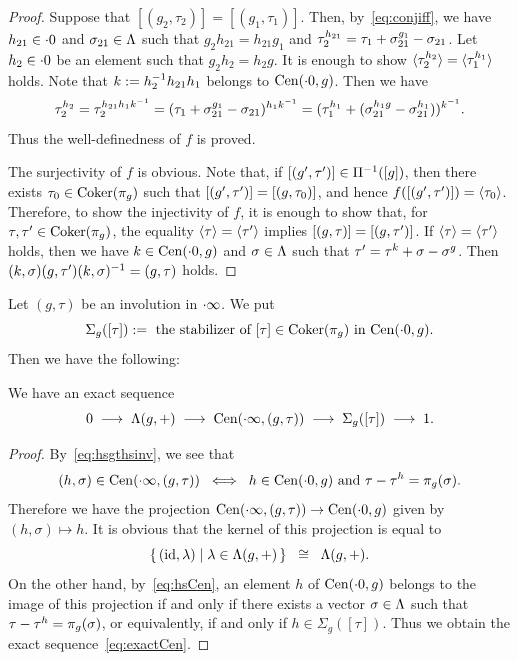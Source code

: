 \documentclass{amsart} %
\begin{document}
%
\begin{proof}
Suppose that $[(g_2, \tau_2)]=[(g_1, \tau_1)] $.
Then, by~\eqref{eq:conjiff}, we have $h_{21}\in \cdot 0$ and $\sigma_{21}\in \Lambda$ 
such that $g_2 h_{21}=h_{21} g_1$
and $\tau_2\sp{h_{21}}=\tau_1 +\sigma_{21}\sp{g_1}-\sigma_{21}$.
Let $h_2\in \cdot 0 $ be an element 
such that $g_2 h_2=h_2 g $.
It is enough to show 
$\langle {\tau_2^{ h_2}} \rangle=\langle {\tau_1^{h_1}} \rangle$ holds.
Note that $k:=h_2^{-1} h_{21} h_1$ belongs to $\mathrm{Cen}(\cdot 0, g)$.
Then we have 
\[
\tau_2^{ h_2}=\tau_2^{ h_{21} h_1 k^{-1}}
=(\tau_1 +\sigma_{21}\sp{g_1}-\sigma_{21})^{ h_1 k^{-1}}
=(\tau_1\sp{ h_1}+(\sigma_{21}\sp{h_1 g}-\sigma_{21}\sp{h_1}))^{k^{-1}}.
\]
Thus the well-definedness of $f$ is proved.
\par
The surjectivity of $f$ is obvious.
Note that, if $[(g^{\prime}, \tau^{\prime})]\in \Pi^{-1}([g])$,
then there exists $\tau_0\in \operatorname{Coker}(\pi_{g})$ such that 
$[(g^{\prime}, \tau^{\prime})]=[(g, \tau_0)]$, 
and hence
$f([(g^{\prime}, \tau^{\prime})])=\langle {\tau_0} \rangle$.
Therefore, to show the injectivity of $f$,
it is enough to show that, 
for $\tau, \tau^{\prime}\in \operatorname{Coker}(\pi_{g})$,
the equality $\langle {\tau} \rangle=\langle {\tau^{\prime}} \rangle$ implies 
$[(g, \tau)]=[(g, \tau^{\prime})]$.
If $\langle {\tau} \rangle=\langle {\tau^{\prime}} \rangle$ holds,
then we have $k\in \mathrm{Cen}(\cdot 0, g)$ and $\sigma\in \Lambda$
such that $\tau^{\prime}=\tau^k+\sigma-\sigma^g$.
Then $(k, \sigma)(g, \tau^{\prime})(k, \sigma)^{-1}=(g, \tau)$ holds.
%
\end{proof}
%
%
%
Let $(g, \tau)$ be an involution in $\cdot \infty$.
We put
\[
\Sigma_g([\tau]) :=
\textrm{ the stabilizer of $[\tau]\in \operatorname{Coker}(\pi_{g})$ in $\mathrm{Cen}(\cdot 0, g)$}.
\]
Then we have the following:
%
\begin{proposition}\label{prop:exactCen}
We have an exact sequence 
%
\begin{equation}\label{eq:exactCen}
0 \;\longrightarrow\; \Lambda(g, +)\;\longrightarrow\; \mathrm{Cen}(\cdot \infty, (g, \tau)) 
\;\longrightarrow\;\Sigma_g([\tau]) \;\longrightarrow\; 1.
\end{equation}
%
\end{proposition}
%
\begin{proof}
By~\eqref{eq:hsgthsinv}, we see that 
%
\begin{equation}\label{eq:hsCen}
(h, \sigma)\in \mathrm{Cen}(\cdot \infty, (g, \tau))
\;\; \Longleftrightarrow\;\; 
\textrm{$h\in \mathrm{Cen}(\cdot 0, g)$ and $\tau-\tau^h=\pi_{g}(\sigma)$}.
\end{equation}
%
Therefore we have the projection 
$\mathrm{Cen}(\cdot \infty, (g, \tau))\to \mathrm{Cen}(\cdot 0, g)$
given by $(h, \sigma)\mapsto h$.
It is obvious that the kernel of this projection is equal to 
\[
\{\,{(\mathord{\mathrm{id}}, \lambda)}\mid {\lambda\in \Lambda(g, +)} \,\}\;\;\cong\;\; \Lambda(g, +).
\]
On the other hand, by~\eqref{eq:hsCen}, 
an element $h$ of $\mathrm{Cen}(\cdot 0, g)$
belongs to the image of this projection if and only if 
there exists a vector $\sigma\in \Lambda$ such that 
$\tau-\tau^h=\pi_{g}(\sigma)$, or equivalently, if and only if 
$h\in \Sigma_g([\tau]) $.
Thus we obtain the exact sequence~\eqref{eq:exactCen}.
\end{proof}
%
%
\end{document}
